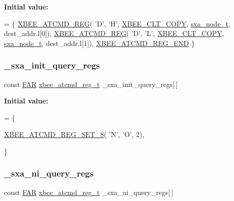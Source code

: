 {\bfseries Initial value\+:}
\begin{DoxyCode}
= \{
   \hyperlink{group__xbee__atcmd_gaafe33c3d8ea48b42b25d1183eaf93071}{XBEE\_ATCMD\_REG}( \textcolor{charliteral}{'D'}, \textcolor{charliteral}{'H'}, \hyperlink{group__xbee__atcmd_gga1bd8ecd38c107579d20ded3c79a7d70baef8d715c8725d801676943b868508633}{XBEE\_CLT\_COPY}, 
      \hyperlink{structsxa__node__t}{sxa\_node\_t}, dest\_addr.l[0]),
   \hyperlink{group__xbee__atcmd_gaafe33c3d8ea48b42b25d1183eaf93071}{XBEE\_ATCMD\_REG}( \textcolor{charliteral}{'D'}, \textcolor{charliteral}{'L'}, \hyperlink{group__xbee__atcmd_gga1bd8ecd38c107579d20ded3c79a7d70baef8d715c8725d801676943b868508633}{XBEE\_CLT\_COPY}, 
      \hyperlink{structsxa__node__t}{sxa\_node\_t}, dest\_addr.l[1]),
   \hyperlink{group__xbee__atcmd_ga22fe547f7ae9fd0b090c5e45f03c162d}{XBEE\_ATCMD\_REG\_END}
\}
\end{DoxyCode}
\mbox{\label{group___s_x_a_gaa4c14a57419394312307388b4fde4a0f}} 
\subsubsection{\texorpdfstring{\+\_\+sxa\+\_\+init\+\_\+query\+\_\+regs}{\_sxa\_init\_query\_regs}}
{\footnotesize\ttfamily const \hyperlink{group__hal_gaef060b3456fdcc093a7210a762d5f2ed}{F\+AR} \hyperlink{structxbee__atcmd__reg__t}{xbee\+\_\+atcmd\+\_\+reg\+\_\+t} \+\_\+sxa\+\_\+init\+\_\+query\+\_\+regs\mbox{[}$\,$\mbox{]}}

{\bfseries Initial value\+:}
\begin{DoxyCode}
= \{
   
   \hyperlink{group__xbee__atcmd_ga37dcc1cfc854d7876be99eff279bf2a0}{XBEE\_ATCMD\_REG\_SET\_8}( \textcolor{charliteral}{'N'}, \textcolor{charliteral}{'O'}, 2),

\}
\end{DoxyCode}
\mbox{\label{group___s_x_a_ga935f2ece9e3b939de8cf5b0a223d5346}} 
\subsubsection{\texorpdfstring{\+\_\+sxa\+\_\+ni\+\_\+query\+\_\+regs}{\_sxa\_ni\_query\_regs}}
{\footnotesize\ttfamily const \hyperlink{group__hal_gaef060b3456fdcc093a7210a762d5f2ed}{F\+AR} \hyperlink{structxbee__atcmd__reg__t}{xbee\+\_\+atcmd\+\_\+reg\+\_\+t} \+\_\+sxa\+\_\+ni\+\_\+query\+\_\+regs\mbox{[}$\,$\mbox{]}}

